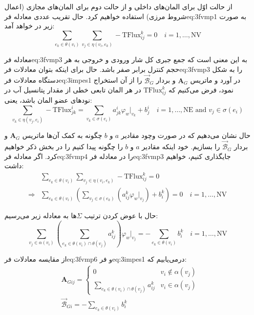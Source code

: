 از حالت اوّل برای المان‌های داخلی و از حالت دوم برای المان‌های مجازی (اعمال شروط مرزی) استفاده خواهیم کرد. حال تقریب عددی معادله ‌فر{eq:3fvmp1} به صورت زیر در خواهد آمد:
\begin{equation}
\label{eq:3fvmp3}
\sum_{e_k\in\theta(v_i)} \sum_{v_j\in\eta(v_i,e_k)} -\text{TFlux}_{ij}^k = 0
\quad i = 1,\ldots,\text{NV}
\end{equation}

معادله ‌فر{eq:3fvmp3} به این معنی است که جمع جبری کل شار ورودی و خروجی به هر حجم کنترل برابر صفر باشد. حال برای اینکه بتوان معادلات ‌فر{eq:3fvmp3} را به شکل دستگاه معادلات ‌فر{eq:3impes1} در آورد و ماتریس $\textbf{A}_G$ و بردار $\vec{\mathcal B}_G$ را از آن استخراج نمود، فرض می‌کنیم که $\text{TFlux}_{ij}^k$ در هر المان تابعی خطی از مقدار پتانسیل آب در نود‌های عضو المان باشد، یعنی:
\begin{equation}
\label{eq:3fvmp4}
\sum_{v_k\in\eta(v_j,e_i)} -\text{TFlux}_{jk}^i = \sum_{v_k\in\sigma(e_i)} a_{jk}^i \varphi_w|_{v_k} + b_j^i
\quad i = 1,\ldots,\text{NE} \text{  and  } v_j \in \sigma(e_i)
\end{equation}

حال نشان می‌دهیم که در صورت وچود مقادیر $a$ و $b$ چگونه به کمک آن‌ها ماتریس $\textbf{A}_G$ و بردار $\vec{\mathcal B}_G$ را بسازیم. خود اینکه مقادیر $a$ و $b$ را چگونه پیدا کنیم را در بخش  ذکر خواهیم کرد. اگر معادله ‌فر{eq:3fvmp4} را در معادله ‌فر{eq:3fvmp3} جایگذاری کنیم، خواهیم داشت:
\begin{equation}
\label{eq:3fvmp5}
\begin{aligned}
&\sum_{e_k\in\theta(v_i)} \sum_{v_j\in\eta(v_i,e_k)} -\text{TFlux}_{ij}^k = 0 \\
\Longrightarrow &\sum_{e_k\in\theta(v_i)} \left(\sum_{v_j\in\sigma(e_k)} \left(a_{ij}^k \varphi_w|_{v_j}\right) + b_i^k\right)= 0
\quad i = 1,\ldots,\text{NV}
\end{aligned}
\end{equation}

حال با عوض کردن ترتیب $\Sigma$ها به معادله زیر می‌رسیم:
\begin{equation}
\label{eq:3fvmp6}
\sum_{v_j\in\alpha(v_i)} \left( \sum_{e_k\in\theta(v_i)\cap\theta(v_j)} a_{ij}^k \right) \varphi_w|_{v_j} =
-\sum_{e_k\in\theta(v_i)} b_i^k 
\quad i = 1,\ldots,\text{NV}
\end{equation}

از مقایسه معادلات ‌فر{eq:3fvmp6} و ‌فر{eq:3impes1} درمی‌یابیم که:
\begin{align}
\label{eq:3fvmp7}
&\textbf{A}_{Gij} = 
\begin{cases}
	0	&v_i \not\in \alpha (v_j)\\
	\sum_{e_k\in\theta(v_i)\cap\theta(v_j)} a_{ij}^k  &v_i \in \alpha (v_j)
\end{cases} \\
\label{eq:3fvmp8}
&\vec{\mathcal B}_{Gi} = -\sum_{e_k\in\theta(v_i)} b_i^k
\end{align}

